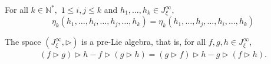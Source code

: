 \documentclass[10pt,a4paper]{amsart}
\begin{document}
\begin{lemma}\label{lemma:eta_k}
For all $k \in \mathbb{N}^*,$ $1 \leq i,j \leq k$ and $h_1, \ldots, h_k \in J_\xi^\infty,$
\[
\eta_k(h_1, \ldots, h_i, \ldots, h_j, \ldots, h_k) = \eta_k(h_1, \ldots, h_j, \ldots, h_i, \ldots, h_k)
\]
\end{lemma}

\begin{proposition}
\label{proposition:post-Lie}
The space $(J_\xi^\infty,\triangleright)$ is a pre-Lie algebra, that is, for all $f,g,h\in J_\xi^\infty$,
\begin{align}
\label{equation:pre-Lie}
(f\triangleright g)\triangleright h-f\triangleright (g\triangleright h)=(g\triangleright f)\triangleright h-g\triangleright (f\triangleright h).
\end{align}
\end{proposition}
\end{document}

